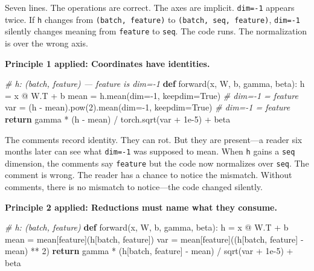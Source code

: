 \documentclass[11pt,titlepage]{article}
\newenvironment{Shaded}{}{}
\newcommand{\BuiltInTok}[1]{#1}
\newcommand{\CommentTok}[1]{\textcolor[rgb]{0.38,0.63,0.69}{\textit{#1}}}
\newcommand{\ControlFlowTok}[1]{\textcolor[rgb]{0.00,0.44,0.13}{\textbf{#1}}}
\newcommand{\DecValTok}[1]{\textcolor[rgb]{0.25,0.63,0.44}{#1}}
\newcommand{\FloatTok}[1]{\textcolor[rgb]{0.25,0.63,0.44}{#1}}
\newcommand{\KeywordTok}[1]{\textcolor[rgb]{0.00,0.44,0.13}{\textbf{#1}}}
\newcommand{\NormalTok}[1]{#1}
\newcommand{\OperatorTok}[1]{\textcolor[rgb]{0.40,0.40,0.40}{#1}}
\newcommand{\VariableTok}[1]{\textcolor[rgb]{0.10,0.09,0.49}{#1}}
\begin{document}
Seven lines. The operations are correct. The axes are implicit.
\texttt{dim=-1} appears twice. If \texttt{h} changes from
\texttt{(batch,\ feature)} to \texttt{(batch,\ seq,\ feature)},
\texttt{dim=-1} silently changes meaning from \texttt{feature} to
\texttt{seq}. The code runs. The normalization is over the wrong axis.

\textbf{Principle 1 applied: Coordinates have identities.}

\begin{Shaded}
\begin{Highlighting}[]
\CommentTok{# h: (batch, feature) — feature is dim=-1}
\KeywordTok{def}\NormalTok{ forward(x, W, b, gamma, beta):}
\NormalTok{    h }\OperatorTok{=}\NormalTok{ x }\OperatorTok{@}\NormalTok{ W.T }\OperatorTok{+}\NormalTok{ b}
\NormalTok{    mean }\OperatorTok{=}\NormalTok{ h.mean(dim}\OperatorTok{=-}\DecValTok{1}\NormalTok{, keepdim}\OperatorTok{=}\VariableTok{True}\NormalTok{)  }\CommentTok{# dim=-1 = feature}
\NormalTok{    var }\OperatorTok{=}\NormalTok{ (h }\OperatorTok{-}\NormalTok{ mean).}\BuiltInTok{pow}\NormalTok{(}\DecValTok{2}\NormalTok{).mean(dim}\OperatorTok{=-}\DecValTok{1}\NormalTok{, keepdim}\OperatorTok{=}\VariableTok{True}\NormalTok{)  }\CommentTok{# dim=-1 = feature}
    \ControlFlowTok{return}\NormalTok{ gamma }\OperatorTok{*}\NormalTok{ (h }\OperatorTok{-}\NormalTok{ mean) }\OperatorTok{/}\NormalTok{ torch.sqrt(var }\OperatorTok{+} \FloatTok{1e-5}\NormalTok{) }\OperatorTok{+}\NormalTok{ beta}
\end{Highlighting}
\end{Shaded}

The comments record identity. They can rot. But they are present---a
reader six months later can see what \texttt{dim=-1} was supposed to
mean. When \texttt{h} gains a \texttt{seq} dimension, the comments say
\texttt{feature} but the code now normalizes over \texttt{seq}. The
comment is wrong. The reader has a chance to notice the mismatch.
Without comments, there is no mismatch to notice---the code changed
silently.

\textbf{Principle 2 applied: Reductions must name what they consume.}

\begin{Shaded}
\begin{Highlighting}[]
\CommentTok{# h: (batch, feature)}
\KeywordTok{def}\NormalTok{ forward(x, W, b, gamma, beta):}
\NormalTok{    h }\OperatorTok{=}\NormalTok{ x }\OperatorTok{@}\NormalTok{ W.T }\OperatorTok{+}\NormalTok{ b}
\NormalTok{    mean }\OperatorTok{=}\NormalTok{ mean[feature](h[batch, feature])}
\NormalTok{    var }\OperatorTok{=}\NormalTok{ mean[feature]((h[batch, feature] }\OperatorTok{-}\NormalTok{ mean) }\OperatorTok{**} \DecValTok{2}\NormalTok{)}
    \ControlFlowTok{return}\NormalTok{ gamma }\OperatorTok{*}\NormalTok{ (h[batch, feature] }\OperatorTok{-}\NormalTok{ mean) }\OperatorTok{/}\NormalTok{ sqrt(var }\OperatorTok{+} \FloatTok{1e-5}\NormalTok{) }\OperatorTok{+}\NormalTok{ beta}
\end{Highlighting}
\end{Shaded}
\end{document}
